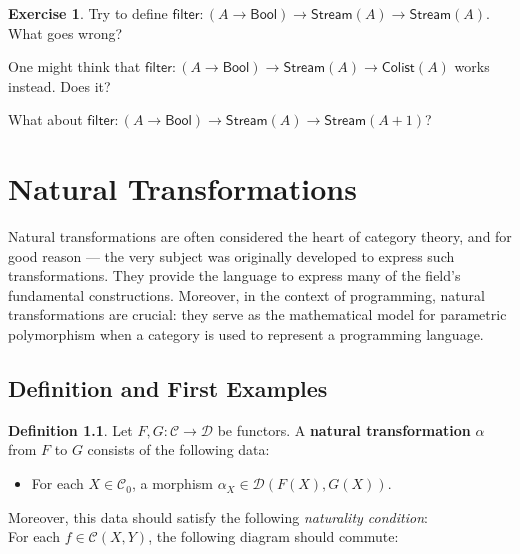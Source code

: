 \documentclass[a4paper,11pt, oneside,titlepage=false]{scrbook}
\theoremstyle{plain}
\theoremstyle{definition}
\newtheorem{dfn}[thm]{Definition}
\newtheorem{exer}[thm]{Exercise}
\newcommand{\Cat}[1]{\mathcal{#1}}
\newcommand{\CC}{\Cat{C}}
\newcommand{\DD}{\Cat{D}}
\newcommand{\Ob}[1]{{#1}_0}
\newcommand{\CHom}[3]{{#1}(#2,#3)}
\newcommand{\Bool}{\ensuremath{\mathsf{Bool}}}
\newcommand{\Colist}{\ensuremath{\mathsf{Colist}}}
\newcommand{\Stream}{\ensuremath{\mathsf{Stream}}}
\newcommand{\filter}{\ensuremath{\mathsf{filter}}}
\begin{document}
\begin{exer}
  Try to define $\filter : (A \to \Bool) \to \Stream(A) \to \Stream(A)$.
  What goes wrong?

  One might think that $\filter : (A \to \Bool) \to \Stream(A) \to \Colist(A)$ works instead.
  Does it?

  What about $\filter : (A \to \Bool) \to \Stream(A) \to \Stream(A+1)$?

\end{exer}

\chapter{Natural Transformations}
\label{sec:nat-trans}

Natural transformations are often considered the heart of category theory, and for good reason
— the very subject was originally developed to express such transformations.
They provide the language to express many of the field's fundamental constructions.
Moreover, in the context of programming, natural transformations are crucial: they serve as the mathematical model for parametric polymorphism when a category is used to represent a programming language.

\section{Definition and First Examples}

\begin{dfn} Let $F,G: \CC\to\DD$ be functors. A \textbf{natural transformation} $\alpha$ from $F$ to $G$ consists of the following data:
\begin{itemize}
\item For each $X\in \Ob{\CC}$, a morphism $\alpha_X \in \CHom{\DD}{F(X)}{G(X)}$.
\end{itemize}
Moreover, this data should satisfy the following \textit{naturality condition}:\\
For each $f\in \CHom{\CC}{X}{Y}$, the following diagram should commute:
\begin{center}
\end{center}
\end{dfn}
\end{document}
